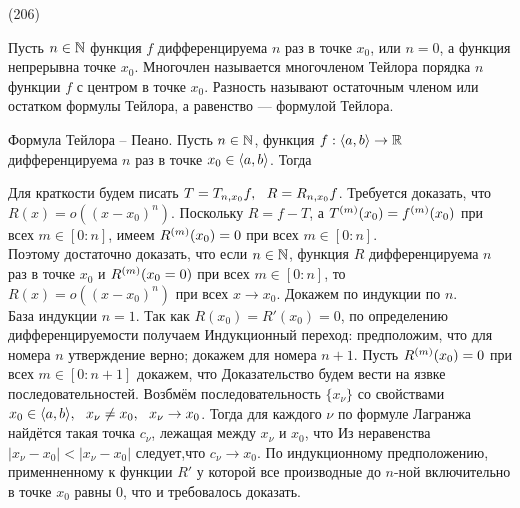 (206)

\Op Пусть $n \in \mathbb{N}$ функция $f$ дифференцируема $n$ раз в точке $x_0$, или $n = 0$, а функция непрерывна точке $x_0$. Многочлен  называется многочленом Тейлора порядка $n$ функции $f$ с центром в точке $x_0$. Разность  называют остаточным членом или остатком формулы Тейлора, а равенство  --- формулой Тейлора.


\T \q Формула Тейлора -- Пеано. Пусть $n \in \mathbb{N}$, функция $f: \langle a, b \rangle \to \mathbb{R}$ дифференцируема $n$ раз в точке $x_0 \in \langle a, b \rangle$. Тогда 

\D Для краткости будем писать $T = T_{n, x_0} f,\ \  R = R_{n, x_0}f$. Требуется доказать, что $R(x) = o((x - x_0)^n)$. Поскольку $R = f - T$, а $T^{(m)} (x_0) = f^{(m)}(x_0)$ при всех $m \in [0: n]$, имеем $R^{(m)}(x_0) = 0$ при всех $m \in [0: n]$.\\
Поэтому достаточно доказать, что если $n \in \mathbb{N}$, функция $R$ дифференцируема $n$ раз в точке $x_0$ и $R^{(m)} (x_0 = 0)$ при всех $m \in [0: n]$, то $R(x) = o((x - x_0)^n)$ при всех $x \to x_0$. Докажем по индукции по $n$.\\
База индукции $n = 1$. Так как $R(x_0) = R'(x_0) = 0$, по определению дифференцируемости получаем 
Индукционный переход: предположим, что для номера $n$ утверждение верно; докажем для номера $n + 1$. Пусть $R^{(m)}(x_0) = 0$ при всех $m \in [0: n + 1]$ докажем, что  Доказательство будем вести на язвке последовательностей. Возбмём последовательность $\{x_\nu\}$ со свойствами $x_0 \in \langle a, b \rangle,\ \  x_\nu \neq x_0,\ \  x_\nu \to x_0$. Тогда для каждого $\nu$ по формуле Лагранжа найдётся такая точка $c_\nu$, лежащая между $x_\nu$ и $x_0$, что  Из неравенства $|x_\nu - x_0| < |x_\nu - x_0|$ следует,что $c_\nu \to x_0$. По индукционному предположению, применненному к функции $R'$ у которой все производные до $n$-ной включительно в точке $x_0$ равны 0,  что и требовалось доказать.